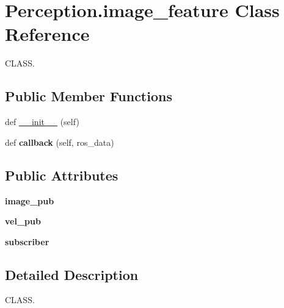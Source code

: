 \hypertarget{classPerception_1_1image__feature}{}\section{Perception.\+image\+\_\+feature Class Reference}
\label{classPerception_1_1image__feature}


C\+L\+A\+SS.  


\subsection*{Public Member Functions}
\begin{DoxyCompactItemize}
\item 
def \hyperlink{classPerception_1_1image__feature_a748b3574bea982b0e5b29a86dfca644e}{\+\_\+\+\_\+init\+\_\+\+\_\+} (self)
\item 
def {\bfseries callback} (self, ros\+\_\+data)\hypertarget{classPerception_1_1image__feature_aa4163f3a9600d001cfd6ac90ba460df9}{}\label{classPerception_1_1image__feature_aa4163f3a9600d001cfd6ac90ba460df9}

\end{DoxyCompactItemize}
\subsection*{Public Attributes}
\begin{DoxyCompactItemize}
\item 
{\bfseries image\+\_\+pub}\hypertarget{classPerception_1_1image__feature_acfc602315032d7e877533594d93ed051}{}\label{classPerception_1_1image__feature_acfc602315032d7e877533594d93ed051}

\item 
{\bfseries vel\+\_\+pub}\hypertarget{classPerception_1_1image__feature_a2582bcb9aca24ef19e5a249684048c84}{}\label{classPerception_1_1image__feature_a2582bcb9aca24ef19e5a249684048c84}

\item 
{\bfseries subscriber}\hypertarget{classPerception_1_1image__feature_a73606194793aca7799100ae95535b072}{}\label{classPerception_1_1image__feature_a73606194793aca7799100ae95535b072}

\end{DoxyCompactItemize}


\subsection{Detailed Description}
C\+L\+A\+SS. 

